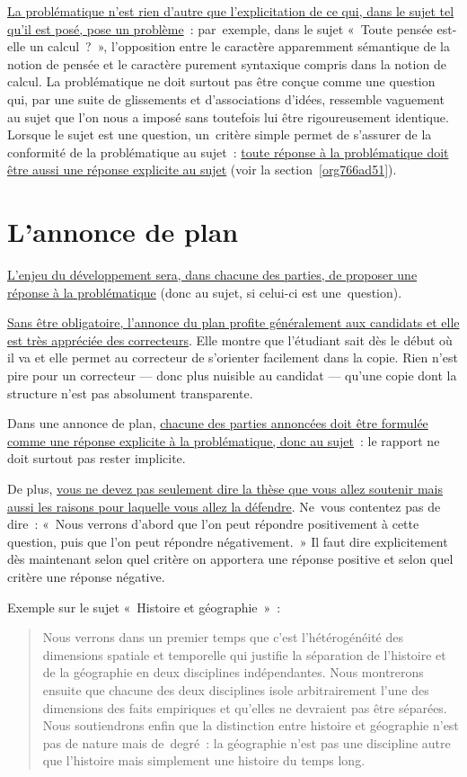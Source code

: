 \documentclass[a4paper,12pt]{report}
\begin{document}
\uline{La problématique n'est rien d'autre que l'explicitation de ce qui, dans
le sujet tel qu'il est posé, pose un problème} : par exemple, dans le
sujet « Toute pensée est-elle un calcul ? », l'opposition entre le
caractère apparemment sémantique de la notion de pensée et le caractère
purement syntaxique compris dans la notion de calcul. La problématique
ne doit surtout pas être conçue comme une question qui, par une suite de
glissements et d'associations d'idées, ressemble vaguement au sujet que
l'on nous a imposé sans toutefois lui être rigoureusement identique.
Lorsque le sujet est une question, un critère simple permet de s'assurer
de la conformité de la problématique au sujet : \uline{toute réponse à la
problématique doit être aussi une réponse explicite au sujet} (voir la
section \ref{org766ad51}).



\section{L'annonce de plan}
\label{sec:org12fb04e}
\label{org439f613}

\uline{L'enjeu du développement sera, dans chacune des parties, de proposer
une réponse à la problématique} (donc au sujet, si celui-ci est
une question).

\uline{Sans être obligatoire, l'annonce du plan profite généralement aux
candi\-dats et elle est très appréciée des correcteurs}. Elle montre que
l'étudiant sait dès le début où il va et elle permet au correcteur de
s'orienter facilement dans la copie. Rien n'est pire pour un correcteur
— donc plus nuisible au candidat — qu'une copie dont la structure n'est
pas absolument transparente.

Dans une annonce de plan, \uline{chacune des parties annoncées doit être
for\-mulée comme une réponse explicite à la problématique, donc au
sujet} : le rapport ne doit surtout pas rester implicite.

De plus, \uline{vous ne devez pas seulement dire la thèse que vous allez
soutenir mais aussi les raisons pour laquelle vous allez la défendre}.
Ne vous contentez pas de dire : « Nous verrons d'abord que l'on peut
répondre positivement à cette question, puis que l'on peut répondre
négativement. » Il faut dire explicitement dès maintenant selon quel
critère on apportera une réponse positive et selon quel critère une
réponse négative.

Exemple sur le sujet « Histoire et géographie » :
\begin{quotation}
Nous verrons dans un premier temps que c'est l'hétérogénéité des
dimensions spatiale et temporelle qui justifie la séparation de
l'histoire et de la géographie en deux disciplines indépendantes. Nous
montrerons ensuite que chacune des deux disciplines isole arbitrairement
l'une des dimensions des faits empiriques et qu'elles ne devraient pas
être séparées. Nous soutiendrons enfin que la distinction entre histoire
et géographie n'est pas de nature mais de degré : la géographie n'est
pas une discipline autre que l'histoire mais simplement une histoire du
temps long.
\end{quotation}
\end{document}

